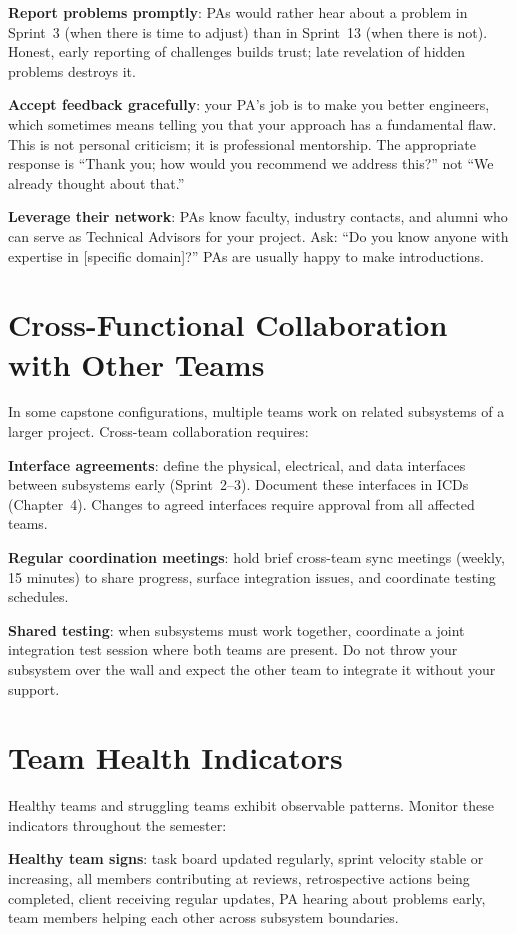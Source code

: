 \textbf{Report problems promptly}: PAs would rather hear about a problem in Sprint~3 (when there is time to adjust) than in Sprint~13 (when there is not). Honest, early reporting of challenges builds trust; late revelation of hidden problems destroys it.

\textbf{Accept feedback gracefully}: your PA's job is to make you better engineers, which sometimes means telling you that your approach has a fundamental flaw. This is not personal criticism; it is professional mentorship. The appropriate response is ``Thank you; how would you recommend we address this?'' not ``We already thought about that.''

\textbf{Leverage their network}: PAs know faculty, industry contacts, and alumni who can serve as Technical Advisors for your project. Ask: ``Do you know anyone with expertise in [specific domain]?'' PAs are usually happy to make introductions.

\section{Cross-Functional Collaboration with Other Teams}
In some capstone configurations, multiple teams work on related subsystems of a larger project. Cross-team collaboration requires:

\textbf{Interface agreements}: define the physical, electrical, and data interfaces between subsystems early (Sprint~2--3). Document these interfaces in ICDs (Chapter~4). Changes to agreed interfaces require approval from all affected teams.

\textbf{Regular coordination meetings}: hold brief cross-team sync meetings (weekly, 15 minutes) to share progress, surface integration issues, and coordinate testing schedules.

\textbf{Shared testing}: when subsystems must work together, coordinate a joint integration test session where both teams are present. Do not throw your subsystem over the wall and expect the other team to integrate it without your support.



\section{Team Health Indicators}
Healthy teams and struggling teams exhibit observable patterns. Monitor these indicators throughout the semester:

\textbf{Healthy team signs}: task board updated regularly, sprint velocity stable or increasing, all members contributing at reviews, retrospective actions being completed, client receiving regular updates, PA hearing about problems early, team members helping each other across subsystem boundaries.


